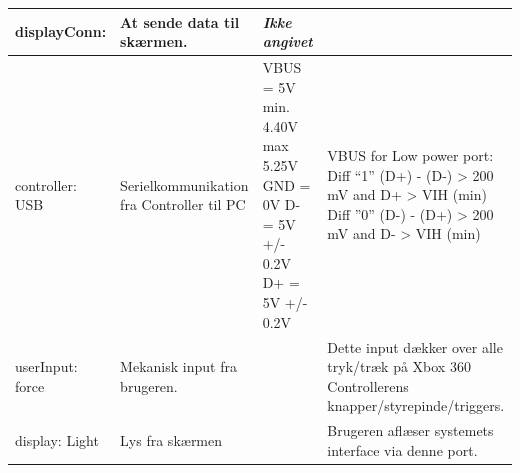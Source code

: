 \begin{table}[h]
\begin{tabularx}{\textwidth}{|l|Z|L{3.5cm}|Z|}
displayConn:
	&   At sende data til skærmen.
	&  \textit{Ikke angivet} 
	&  
	\\ \hline
	
controller: USB
	& Serielkommunikation fra Controller til PC 
	& VBUS = 5V min. 4.40V max 5.25V \newline
		GND = 0V \newline
		D- = 5V +/- 0.2V \newline
		D+ = 5V +/- 0.2V \newline
	& VBUS for Low power port: \newline
		Diff  “1” \newline
		(D+) - (D-) > 200 mV \newline
		and D+ > VIH (min) \newline
		Diff ”0” \newline
		(D-) - (D+) > 200 mV \newline
		and D- > VIH (min)
	\\ \hline
	
userInput: force
	& Mekanisk input fra brugeren.
	& 
	& Dette input dækker over alle tryk/træk på Xbox 360 Controllerens knapper/styrepinde/triggers.
	\\ \hline
	
display: Light
	& Lys fra skærmen
	& 
	& Brugeren aflæser systemets interface via denne port.
	\\ \hline
	\end{tabularx}
\end{table}